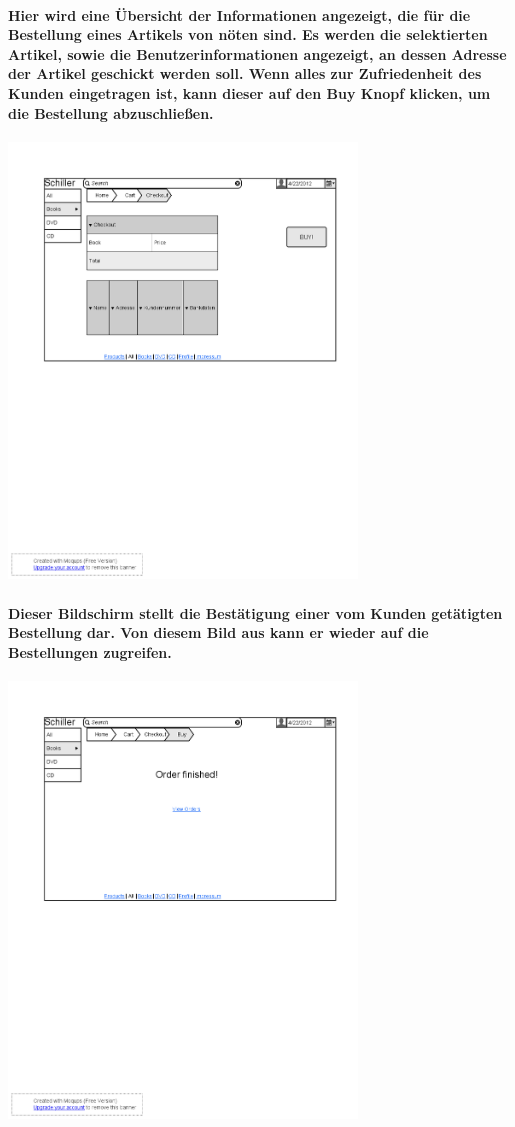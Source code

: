 \documentclass[a4paper]{article}
\begin{document}
\paragraph{Hier wird eine Übersicht der Informationen angezeigt, die für die Bestellung eines Artikels von nöten sind. Es werden die selektierten Artikel, sowie die Benutzerinformationen angezeigt, an dessen Adresse der Artikel geschickt werden soll. Wenn alles zur Zufriedenheit des Kunden eingetragen ist, kann dieser auf den Buy Knopf klicken, um die Bestellung abzuschließen.\\}
\includegraphics[width=350px]{9CheckOut.png}

\paragraph{Dieser Bildschirm stellt die Bestätigung einer vom Kunden getätigten Bestellung dar. Von diesem Bild aus kann er wieder auf die Bestellungen zugreifen.\\}
\includegraphics[width=350px]{10SuccessfullyOrdered.png}
\end{document}
